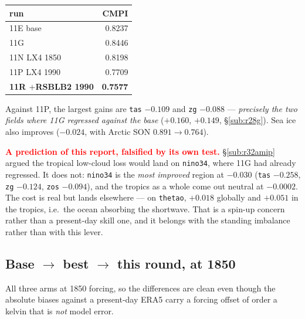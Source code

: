 \documentclass[10pt]{article}
\begin{document}
\begin{center}\small
\begin{tabular}{lr}
\toprule
run & CMPI \\
\midrule
11E base & 0.8237 \\
11G & 0.8446 \\
11N LX4 1850 & 0.8198 \\
11P LX4 1990 & 0.7709 \\
\textbf{11R $+$RSBLB2 1990} & \textbf{0.7577} \\
\bottomrule
\end{tabular}
\end{center}

Against 11P, the largest gains are \texttt{tas} $-0.109$ and \texttt{zg} $-0.088$ ---
\emph{precisely the two fields where 11G regressed against the base} ($+0.160$, $+0.149$,
\S\ref{sub:r28g}). Sea ice also improves ($-0.024$, with Arctic SON $0.891\to0.764$).

\textcolor{red}{\textbf{A prediction of this report, falsified by its own test.}}
\S\ref{sub:r32amip} argued the tropical low-cloud loss would land on \texttt{nino34},
where 11G had already regressed. It does not: \texttt{nino34} is the \emph{most improved}
region at $-0.030$ (\texttt{tas} $-0.258$, \texttt{zg} $-0.124$, \texttt{zos} $-0.094$),
and the tropics as a whole come out neutral at $-0.0002$. The cost is real but lands
elsewhere --- on \texttt{thetao}, $+0.018$ globally and $+0.051$ in the tropics, i.e.\ the
ocean absorbing the shortwave. That is a spin-up concern rather than a present-day skill
one, and it belongs with the standing imbalance rather than with this lever.

\subsection{Base $\to$ best $\to$ this round, at 1850}\label{sub:r32threeway}

All three arms at 1850 forcing, so the differences are clean even though the absolute
biases against a present-day ERA5 carry a forcing offset of order a kelvin that is
\emph{not} model error.
\end{document}
